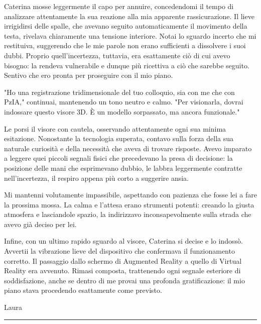 
Caterina mosse leggermente il capo per annuire, concedendomi il tempo di analizzare attentamente la sua reazione alla mia apparente rassicurazione. Il lieve irrigidirsi delle spalle, che avevano seguito automaticamente il movimento della testa, rivelava chiaramente una tensione interiore. Notai lo sguardo incerto che mi restituiva, suggerendo che le mie parole non erano sufficienti a dissolvere i suoi dubbi. Proprio quell’incertezza, tuttavia, era esattamente ciò di cui avevo bisogno: la rendeva vulnerabile e dunque più ricettiva a ciò che sarebbe seguito. Sentivo che ero pronta per proseguire con il mio piano.

\begin{dialogue}
"Ho una registrazione tridimensionale del tuo colloquio, sia con me che con PzIA," continuai, mantenendo un tono neutro e calmo. "Per visionarla, dovrai indossare questo visore 3D. È un modello sorpassato, ma ancora funzionale."
\end{dialogue}
Le porsi il visore con cautela, osservando attentamente ogni sua minima esitazione. Nonostante la tecnologia superata, contavo sulla forza della sua naturale curiosità e della necessità che aveva di trovare risposte. Avevo imparato a leggere quei piccoli segnali fisici che precedevano la presa di decisione: la posizione delle mani che esprimevano dubbio, le labbra leggermente contratte nell’incertezza, il respiro appena più corto a suggerire ansia.

Mi mantenni volutamente impassibile, aspettando con pazienza che fosse lei a fare la prossima mossa. La calma e l’attesa erano strumenti potenti: creando la giusta atmosfera e lasciandole spazio, la indirizzavo inconsapevolmente sulla strada che avevo già deciso per lei.

Infine, con un ultimo rapido sguardo al visore, Caterina si decise e lo indossò. Avvertii la vibrazione lieve del dispositivo che confermava il funzionamento corretto. Il passaggio dallo schermo di Augmented Reality a quello di Virtual Reality era avvenuto. Rimasi composta, trattenendo ogni segnale esteriore di soddisfazione, anche se dentro di me provai una profonda gratificazione: il mio piano stava procedendo esattamente come previsto.



\vspace{1em}
\begin{center}Laura\end{center}
\hrule
\vspace{1em}

